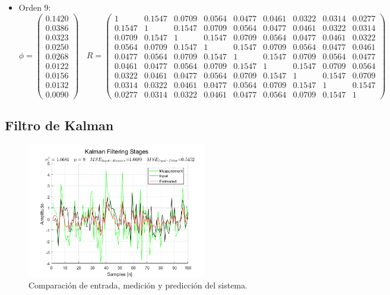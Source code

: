 \begin{itemize}
\item Orden 9:
\begin{equation*}
	\phi = 
	\begin{pmatrix}
		0.1420 \\
		0.0386 \\
		0.0323 \\
		0.0250 \\
		0.0268 \\
		0.0122 \\
		0.0156 \\
		0.0132 \\
		0.0090
	\end{pmatrix}	\	\	\	\
	R =
	\begin{pmatrix}	
	1 & 0.1547 & 0.0709 & 0.0564 & 0.0477 & 0.0461 & 0.0322 & 0.0314 & 0.0277 \\
	0.1547 & 1 & 0.1547 & 0.0709 & 0.0564 & 0.0477 & 0.0461 & 0.0322 & 0.0314 \\
	0.0709 & 0.1547 & 1 & 0.1547 & 0.0709 & 0.0564 & 0.0477 & 0.0461 & 0.0322 \\
	0.0564 & 0.0709 & 0.1547 & 1 & 0.1547 & 0.0709 & 0.0564 & 0.0477 & 0.0461 \\
	0.0477 & 0.0564 & 0.0709 & 0.1547 & 1 & 0.1547 & 0.0709 & 0.0564 & 0.0477 \\
	0.0461 & 0.0477 & 0.0564 & 0.0709 & 0.1547 & 1 & 0.1547 & 0.0709 & 0.0564 \\
	0.0322 & 0.0461 & 0.0477 & 0.0564 & 0.0709 & 0.1547 & 1 & 0.1547 & 0.0709 \\
	0.0314 & 0.0322 & 0.0461 & 0.0477 & 0.0564 & 0.0709 & 0.1547 & 1 & 0.1547 \\
	0.0277 & 0.0314 & 0.0322 & 0.0461 & 0.0477 & 0.0564 & 0.0709 & 0.1547 & 1	  
	\end{pmatrix}
\end{equation*}

\end{itemize}

\subsection{Filtro de Kalman}

\begin{figure}[H]
\centering
	\includegraphics[width=0.7\textwidth, trim = {0 0 0 0},clip]{./Imagenes/Kalman_Filter.png}
	\caption{Comparación de entrada, medición y predicción del sistema.}
	\label{fig:kalmanfilter}
\end{figure}

